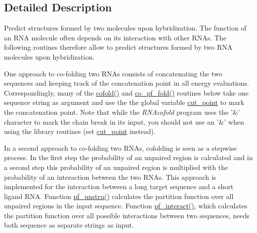 \subsection{Detailed Description}
Predict structures formed by two molecules upon hybridization. The function of an R\-N\-A molecule often depends on its interaction with other R\-N\-As. The following routines therefore allow to predict structures formed by two R\-N\-A molecules upon hybridization.\par
One approach to co-\/folding two R\-N\-As consists of concatenating the two sequences and keeping track of the concatenation point in all energy evaluations. Correspondingly, many of the \hyperlink{group__mfe__cofold_gabc8517f22cfe70595ee81fc837910d52}{cofold()} and \hyperlink{part__func__co_8h_ae5c1e7331718669bdae7a86de2be6184}{co\-\_\-pf\-\_\-fold()} routines below take one sequence string as argument and use the the global variable \hyperlink{fold__vars_8h_ab9b2c3a37a5516614c06d0ab54b97cda}{cut\-\_\-point} to mark the concatenation point. Note that while the {\itshape R\-N\-Acofold} program uses the '\&' character to mark the chain break in its input, you should not use an '\&' when using the library routines (set \hyperlink{fold__vars_8h_ab9b2c3a37a5516614c06d0ab54b97cda}{cut\-\_\-point} instead).\par
In a second approach to co-\/folding two R\-N\-As, cofolding is seen as a stepwise process. In the first step the probability of an unpaired region is calculated and in a second step this probability of an unpaired region is multiplied with the probability of an interaction between the two R\-N\-As. This approach is implemented for the interaction between a long target sequence and a short ligand R\-N\-A. Function \hyperlink{group__up__cofold_ga5b4ee40e190d2f633cd01cf0d2fe93cf}{pf\-\_\-unstru()} calculates the partition function over all unpaired regions in the input sequence. Function \hyperlink{group__up__cofold_ga1aa0aa02bc3a724f87360c03097afd00}{pf\-\_\-interact()}, which calculates the partition function over all possible interactions between two sequences, needs both sequence as separate strings as input. 